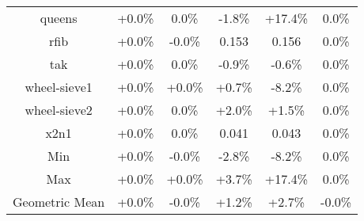 \begin{tabular}{ c c c c c c }
queens & +0.0\% &  0.0\% & -1.8\% & +17.4\% &  0.0\%\\
rfib & +0.0\% & -0.0\% & 0.153 & 0.156 &  0.0\%\\
tak & +0.0\% &  0.0\% & -0.9\% & -0.6\% &  0.0\%\\
wheel-sieve1 & +0.0\% & +0.0\% & +0.7\% & -8.2\% &  0.0\%\\
wheel-sieve2 & +0.0\% &  0.0\% & +2.0\% & +1.5\% &  0.0\%\\
x2n1 & +0.0\% &  0.0\% & 0.041 & 0.043 &  0.0\%\\
\hline
Min & +0.0\% & -0.0\% & -2.8\% & -8.2\% &  0.0\%\\
Max & +0.0\% & +0.0\% & +3.7\% & +17.4\% &  0.0\%\\
Geometric Mean & +0.0\% & -0.0\% & +1.2\% & +2.7\% & -0.0\%\\


\end{tabular}
